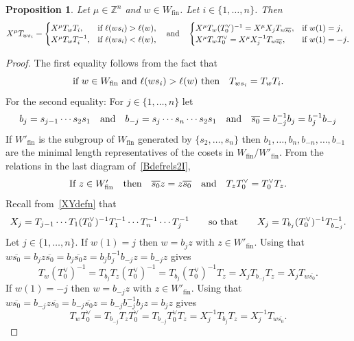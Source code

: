 \documentclass[11pt]{article}
\theoremstyle{plain}
\newtheorem{prop}[thm]{Proposition}
\theoremstyle{definition}
\theoremstyle{remark}
\numberwithin{equation}{section}
\def\ZZ{\mathbb{Z}}
\newcounter{r}
\newcounter{s}
\begin{document}
\begin{prop} \label{xzsicross}
Let $\mu\in \ZZ^n$ and $w\in W_{\mathrm{fin}}$.  Let $i\in \{1, \ldots, n\}$.  Then
$$X^\mu T_{ws_i} = \begin{cases}
X^\mu T_w T_i, &\hbox{if $\ell(ws_i)>\ell(w)$,} \\
X^\mu T_w T_i^{-1}, &\hbox{if $\ell(ws_i)<\ell(w)$,} 
\end{cases}
\quad\hbox{and}\quad
\begin{cases}
X^\mu T_w(T_0^{\vee})^{-1} = X^\mu X_j T_{w\overline{s_0}}, &\hbox{if $w(1) = j$,} \\
X^\mu T_wT_0^{\vee} = X^\mu X_j^{-1} T_{w\overline{s_0}}, &\hbox{if $w(1) = -j$.} 
\end{cases}
$$
\end{prop}
\begin{proof}
The first equality follows from the fact that
$$\hbox{if $w\in W_{\mathrm{fin}}$ and $\ell(ws_i)>\ell(w)$ then}\quad T_{ws_i} = T_w T_i .
$$
For the second equality:  For $j\in \{1, \ldots, n\}$ let
$$b_j = s_{j-1}\cdots s_2s_1 
\quad\hbox{and}\quad
b_{-j} = s_j\cdots s_n\cdots s_2s_1
\quad\hbox{and}\quad
\overline{s_0} = b_{-j}^{-1}b_j = b_j^{-1}b_{-j} 
$$
If $W'_{\mathrm{fin}}$ is the subgroup of $W_{\mathrm{fin}}$ generated by $\{s_2, \ldots, s_n\}$ then
$b_1, \ldots, b_n, b_{-n}, \ldots, b_{-1}$ are the minimal length representatives of the cosets in $W_{\mathrm{fin}}/W'_{\mathrm{fin}}$.
From the relations in the last diagram of~\eqref{Bdefrels2I},
$$
\hbox{If $z\in W'_{\mathrm{fin}}$\quad then}\quad
\overline{s_0}z = z\overline{s_0}
\quad\hbox{and}\quad
T_zT_0^{\vee} = T_0^{\vee} T_z.
$$
Recall from~\eqref{XYdefn} that
$$X_j
= T_{j-1}\cdots T_1(T_0^{\vee})^{-1}T_1^{-1}\cdots T_n^{-1}\cdots T_j^{-1}
\qquad\hbox{so that}\qquad
X_j = T_{b_j}(T_0^{\vee})^{-1}T_{b_{-j}}^{-1}.
$$
Let $j\in \{1, \ldots, n\}$.  If $w(1) = j$ then $w = b_j z$ with $z\in W'_{\mathrm{fin}}$.  
Using that $w \overline{s_0} = b_j z \overline{s_0}
=b_j \overline{s_0} z = b_jb_j^{-1}b_{-j}z = b_{-j}z$ gives
$$T_w(T_0^{\vee})^{-1} = T_{b_j} T_z (T_0^{\vee})^{-1} = T_{b_j}(T_0^{\vee})^{-1}T_z = X_jT_{b_{-j}}T_z = X_jT_{w \overline{s_0} }.
$$
If $w(1)=-j$ then $w=b_{-j}z$ with $z\in W'_{\mathrm{fin}}$.  
Using that $w \overline{s_0} = b_{-j}z \overline{s_0}
=b_{-j} \overline{s_0} z = b_{-j}b_{-j}^{-1}b_j z = b_j z$ gives
$$T_wT_0^{\vee} = T_{b_{-j}}T_zT_0^{\vee} = T_{b_{-j}}T_0^{\vee} T_z  = X_j^{-1}T_{b_j}T_z = X_j^{-1}T_{w \overline{s_0}}.
$$
\end{proof}
\end{document}
